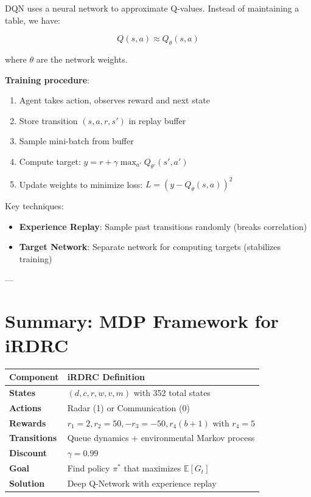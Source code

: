 \documentclass[12pt,a4paper]{article}
\begin{document}
DQN uses a neural network to approximate Q-values. Instead of maintaining a table, we have:

\[
Q(s, a) \approx Q_\theta(s, a)
\]

where $\theta$ are the network weights.

\textbf{Training procedure}:
\begin{enumerate}
    \item Agent takes action, observes reward and next state
    \item Store transition $(s, a, r, s')$ in replay buffer
    \item Sample mini-batch from buffer
    \item Compute target: $y = r + \gamma \max_{a'} Q_{\theta'}(s', a')$
    \item Update weights to minimize loss: $L = (y - Q_\theta(s, a))^2$
\end{enumerate}

Key techniques:
\begin{itemize}
    \item \textbf{Experience Replay}: Sample past transitions randomly (breaks correlation)
    \item \textbf{Target Network}: Separate network for computing targets (stabilizes training)
\end{itemize}

---

\section{Summary: MDP Framework for iRDRC}

\begin{table}[h]
\centering
\begin{tabular}{|l|l|}
\hline
\textbf{Component} & \textbf{iRDRC Definition} \\
\hline
\textbf{States} & $(d, c, r, w, v, m)$ with 352 total states \\
\hline
\textbf{Actions} & Radar (1) or Communication (0) \\
\hline
\textbf{Rewards} & $r_1=2, r_2=50, -r_3=-50, r_4(b+1)$ with $r_4=5$ \\
\hline
\textbf{Transitions} & Queue dynamics + environmental Markov process \\
\hline
\textbf{Discount} & $\gamma = 0.99$ \\
\hline
\textbf{Goal} & Find policy $\pi^*$ that maximizes $\mathbb{E}[G_t]$ \\
\hline
\textbf{Solution} & Deep Q-Network with experience replay \\
\hline
\end{tabular}
\end{table}
\end{document}
